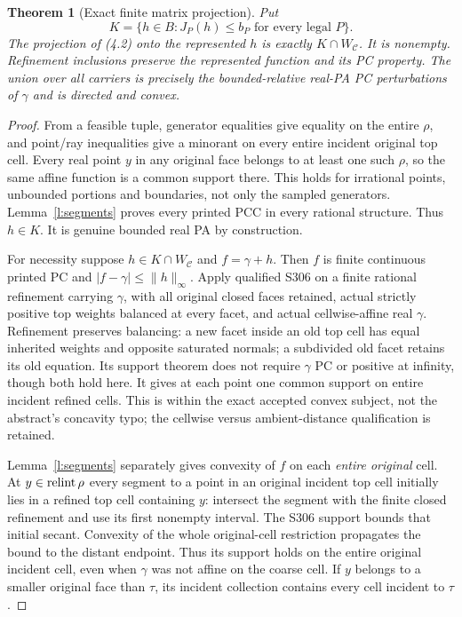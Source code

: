 \documentclass[11pt]{article}
\newtheorem{theorem}{Theorem}[section]
\begin{document}
\begin{theorem}[Exact finite matrix projection]\label{t:matrix}
Put
\[
 K=\{h\in B:J_P(h)\leq b_P\text{ for every legal }P\}.                \tag{4.3}
\]
The projection of (4.2) onto the represented $h$ is exactly $K\cap W_\mathcal C$. It is nonempty. Refinement inclusions preserve the represented function and its PC property. The union over all carriers is precisely the bounded-relative real-PA PC perturbations of $\gamma$ and is directed and convex.
\end{theorem}
\begin{proof}
From a feasible tuple, generator equalities give equality on the entire $\rho$, and point/ray inequalities give a minorant on every entire incident original top cell. Every real point $y$ in any original face belongs to at least one such $\rho$, so the same affine function is a common support there. This holds for irrational points, unbounded portions and boundaries, not only the sampled generators. Lemma~\ref{l:segments} proves every printed PCC in every rational structure. Thus $h\in K$. It is genuine bounded real PA by construction.

For necessity suppose $h\in K\cap W_\mathcal C$ and $f=\gamma+h$. Then $f$ is finite continuous printed PC and $|f-\gamma|\leq\|h\|_\infty$. Apply qualified S306 on a finite rational refinement carrying $\gamma$, with all original closed faces retained, actual strictly positive top weights balanced at every facet, and actual cellwise-affine real $\gamma$. Refinement preserves balancing: a new facet inside an old top cell has equal inherited weights and opposite saturated normals; a subdivided old facet retains its old equation. Its support theorem does not require $\gamma$ PC or positive at infinity, though both hold here. It gives at each point one common support on entire incident refined cells. This is within the exact accepted convex subject, not the abstract's concavity typo; the cellwise versus ambient-distance qualification is retained.

Lemma~\ref{l:segments} separately gives convexity of $f$ on each \emph{entire original} cell. At $y\in\operatorname{relint}\rho$ every segment to a point in an original incident top cell initially lies in a refined top cell containing $y$: intersect the segment with the finite closed refinement and use its first nonempty interval. The S306 support bounds that initial secant. Convexity of the whole original-cell restriction propagates the bound to the distant endpoint. Thus its support holds on the entire original incident cell, even when $\gamma$ was not affine on the coarse cell. If $y$ belongs to a smaller original face than $\tau$, its incident collection contains every cell incident to $\tau$.


\end{proof}
\end{document}
